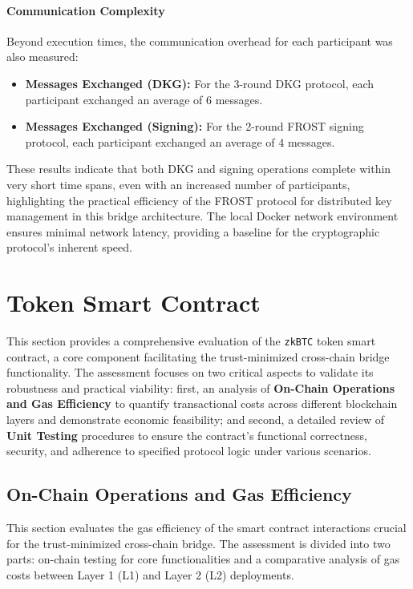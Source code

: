 \documentclass{DESSThesis}
\newcommand{\zktoken}{\texttt{zkBTC}}
\begin{document}
\paragraph{Communication Complexity}
Beyond execution times, the communication overhead for each participant was also measured:
\begin{itemize}
    \item \textbf{Messages Exchanged (DKG):} For the 3-round DKG protocol, each participant exchanged an average of 6 messages.
    \item \textbf{Messages Exchanged (Signing):} For the 2-round FROST signing protocol, each participant exchanged an average of 4 messages.
\end{itemize}
These results indicate that both DKG and signing operations complete within very short time spans, even with an increased number of participants, highlighting the practical efficiency of the FROST protocol for distributed key management in this bridge architecture. The local Docker network environment ensures minimal network latency, providing a baseline for the cryptographic protocol's inherent speed.

\section{Token Smart Contract}
This section provides a comprehensive evaluation of the \texttt{\zktoken} token smart contract, a core component facilitating the trust-minimized cross-chain bridge functionality. The assessment focuses on two critical aspects to validate its robustness and practical viability: first, an analysis of \textbf{On-Chain Operations and Gas Efficiency} to quantify transactional costs across different blockchain layers and demonstrate economic feasibility; and second, a detailed review of \textbf{Unit Testing} procedures to ensure the contract's functional correctness, security, and adherence to specified protocol logic under various scenarios.


\subsection{On-Chain Operations and Gas Efficiency}
This section evaluates the gas efficiency of the smart contract interactions crucial for the trust-minimized cross-chain bridge. The assessment is divided into two parts: on-chain testing for core functionalities and a comparative analysis of gas costs between Layer 1 (L1) and Layer 2 (L2) deployments.
\end{document}
